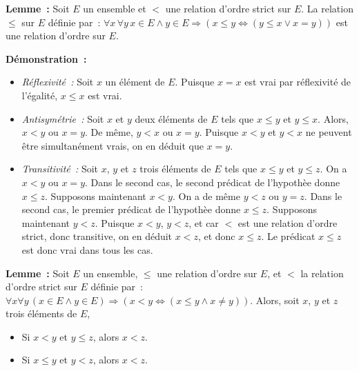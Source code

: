 \hfill\square

\medskip

\noindent\textbf{Lemme :} Soit $E$ un ensemble et $<$ une relation d'ordre strict sur $E$. 
    La relation $\leq$ sur $E$ définie par : $\forall x \, \forall y \, x \in E \wedge y \in E \Rightarrow (x \leq y \Leftrightarrow (y \leq x \vee x = y))$ est une relation d'ordre sur $E$. 

\medskip

\noindent\textbf{Démonstration :} 
\begin{itemize}[nosep]
    \item \textit{Réflexivité :} Soit $x$ un élément de $E$. 
        Puisque $x = x$ est vrai par réflexivité de l'égalité, $x \leq x$ est vrai.
    \item \textit{Antisymétrie :} Soit $x$ et $y$ deux éléments de $E$ tels que $x \leq y$ et $y \leq x$. 
        Alors, $x < y$ ou $x = y$. 
        De même, $y < x$ ou $x = y$. 
        Puisque $x < y$ et $y < x$ ne peuvent être simultanément vrais, on en déduit que $x = y$.
    \item \textit{Transitivité :} Soit $x$, $y$ et $z$ trois éléments de $E$ tels que $x \leq y$ et $y \leq z$. 
        On a $x < y$ ou $x = y$.
        Dans le second cas, le second prédicat de l'hypothèe donne $x \leq z$.
        Supposons maintenant $x < y$. 
        On a de même $y < z$ ou $y = z$. 
        Dans le second cas, le premier prédicat de l'hypothèe donne $x \leq z$.
        Supposons maintenant $y < z$. 
        Puisque $x < y$, $y < z$, et car $<$ est une relation d'ordre strict, donc transitive, on en déduit $x < z$, et donc $x \leq z$. 
        Le prédicat $x \leq z$ est donc vrai dans tous les cas.
\end{itemize}

\hfill\square

\medskip

\noindent\textbf{Lemme :} Soit $E$ un ensemble, $\leq$ une relation d'ordre sur $E$, et $<$ la relation d'ordre strict sur $E$ définie par : $\forall x \forall y \, (x \in E \wedge y \in E) \Rightarrow (x < y \Leftrightarrow (x \leq y \wedge x \neq y))$.
Alors, soit $x$, $y$ et $z$ trois éléments de $E$, 
\begin{itemize}[nosep]
    \item Si $x < y$ et $y \leq z$, alors $x < z$.
    \item Si $x \leq y$ et $y < z$, alors $x < z$.
\end{itemize}

\medskip

